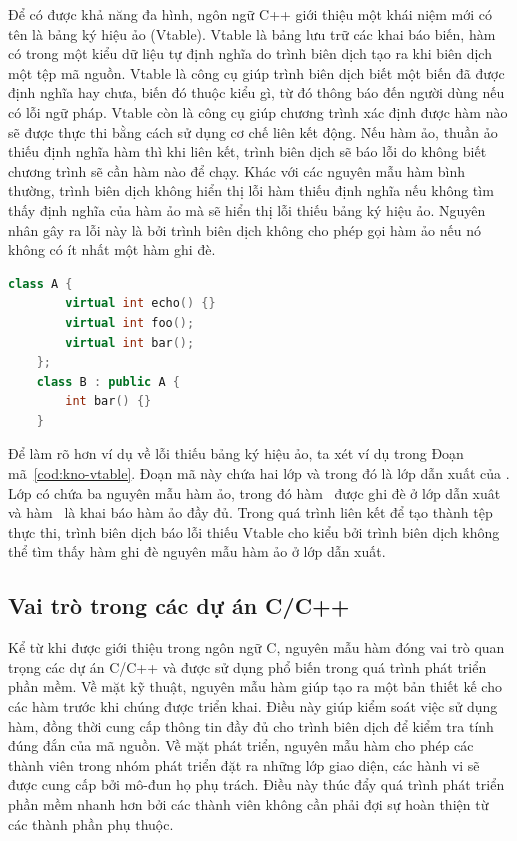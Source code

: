 Để có được khả năng đa hình, ngôn ngữ C++ giới thiệu một khái niệm mới có tên là bảng ký hiệu ảo (Vtable). Vtable là bảng lưu trữ các khai báo biến, hàm có trong một kiểu dữ liệu tự định nghĩa do trình biên dịch tạo ra khi biên dịch một tệp mã nguồn. Vtable là công cụ giúp trình biên dịch biết một biến đã được định nghĩa hay chưa, biến đó thuộc kiểu gì, từ đó thông báo đến người dùng nếu có lỗi ngữ pháp. Vtable còn là công cụ giúp chương trình xác định được hàm nào sẽ được thực thi bằng cách sử dụng cơ chế liên kết động. Nếu hàm ảo, thuần ảo thiếu định nghĩa hàm thì khi liên kết, trình biên dịch sẽ báo lỗi do không biết chương trình sẽ cần hàm nào để chạy. Khác với các nguyên mẫu hàm bình thường, trình biên dịch không hiển thị lỗi hàm thiếu định nghĩa nếu không tìm thấy định nghĩa của hàm ảo mà sẽ hiển thị lỗi thiếu bảng ký hiệu ảo. Nguyên nhân gây ra lỗi này là bởi trình biên dịch không cho phép gọi hàm ảo nếu nó không có ít nhất một hàm ghi đè.\\

\begin{lstlisting}[language=C++, captionpos=b, caption={Ví dụ về lỗi thiếu bảng ký hiệu ảo.}, label={cod:kno-vtable}]
	class A {
		virtual int echo() {}
		virtual int foo();
		virtual int bar();
	};
	class B : public A {
		int bar() {}
	}
\end{lstlisting}

Để làm rõ hơn ví dụ về lỗi thiếu bảng ký hiệu ảo, ta xét ví dụ trong Đoạn mã~\ref{cod:kno-vtable}. Đoạn mã này chứa hai lớp  và  trong đó  là lớp dẫn xuất của . Lớp  có chứa ba nguyên mẫu hàm ảo, trong đó hàm~ được ghi đè ở lớp dẫn xuât và hàm~ là khai báo hàm ảo đầy đủ. Trong quá trình liên kết để tạo thành tệp thực thi, trình biên dịch báo lỗi thiếu Vtable cho kiểu  bởi trình biên dịch không thể tìm thấy hàm ghi đè nguyên mẫu hàm ảo  ở lớp dẫn xuất.

\subsection{Vai trò trong các dự án C/C++}
Kể từ khi được giới thiệu trong ngôn ngữ C, nguyên mẫu hàm đóng vai trò quan trọng các dự án C/C++ và được sử dụng phổ biến trong quá trình phát triển phần mềm.	Về mặt kỹ thuật, nguyên mẫu hàm giúp tạo ra một bản thiết kế cho các hàm trước khi chúng được triển khai. Điều này giúp kiểm soát việc sử dụng hàm, đồng thời cung cấp thông tin đầy đủ cho trình biên dịch để kiểm tra tính đúng đắn của mã nguồn. Về mặt phát triển, nguyên mẫu hàm cho phép các thành viên trong nhóm phát triển đặt ra những lớp giao diện, các hành vi sẽ được cung cấp bởi mô-đun họ phụ trách. Điều này thúc đẩy quá trình phát triển phần mềm nhanh hơn bởi các thành viên không cần phải đợi sự hoàn thiện từ các thành phần phụ thuộc. 


